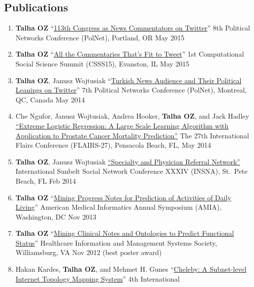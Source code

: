 \documentclass[11pt, letter]{article}
\begin{document}
\begin{raggedright}
\section{Publications}\label{publications}

\begin{enumerate}
\def\labelenumi{\arabic{enumi}.}
\itemsep1pt\parskip0pt
\item
  \textbf{Talha OZ} ``\href{http://toz.us/pubs/\#toAppear}{113th
  Congress as News Commentators on Twitter}'' 8th Political Networks
  Conference (PolNet), Portland, OR May 2015
\item
  \textbf{Talha OZ} ``\href{http://toz.us/pubs/\#toAppear}{All the
  Commentaries That's Fit to Tweet}'' 1st Computational Social Science
  Summit (CSSS15), Evanston, IL May 2015
\item
  \textbf{Talha OZ}, Janusz Wojtusiak
  ``\href{http://www.mli.gmu.edu/toz/publications/2014-POLNET.pdf}{Turkish
  News Audience and Their Political Leanings on Twitter}'' 7th Political
  Networks Conference (PolNet), Montreal, QC, Canada May 2014
\item
  Che Ngufor, Janusz Wojtusiak, Andrea Hooker, \textbf{Talha OZ}, and
  Jack Hadley
  \href{http://www.mli.gmu.edu/toz/publications/2014-FLAIRS.pdf}{``Extreme
  Logistic Regression: A Large Scale Learning Algorithm with Application
  to Prostate Cancer Mortality Prediction''} The 27th International
  Flairs Conference (FLAIRS-27), Pensacola Beach, FL, May 2014
\item
  \textbf{Talha OZ}, Janusz Wojtusiak
  \href{http://www.mli.gmu.edu/toz/publications/2014-SUNBELT.pdf}{``Specialty
  and Physician Referral Network''} International Sunbelt Social Network
  Conference XXXIV (INSNA), St.~Pete Beach, FL Feb 2014
\item
  \textbf{Talha OZ}
  ``\href{http://www.mli.gmu.edu/toz/publications/2013-AMIA.pdf}{Mining
  Progress Notes for Prediction of Activities of Daily Living}''
  American Medical Informatics Annual Symposium (AMIA), Washington, DC
  Nov 2013
\item
  \textbf{Talha OZ}
  ``\href{http://www.mli.gmu.edu/toz/publications/2012-HIMSS.pdf}{Mining
  Clinical Notes and Ontologies to Predict Functional Status}''
  Healthcare Information and Management Systems Society, Williamsburg,
  VA Nov 2012 (best poster award)
\item
  Hakan Kardes, \textbf{Talha OZ}, and Mehmet H. Gunes
  ``\href{http://www.mli.gmu.edu/toz/publications/2012-COMSNETS.pdf}{Cheleby:
  A Subnet-level Internet Topology Mapping System}'' 4th International

\end{enumerate}
\end{raggedright}
\end{document}
